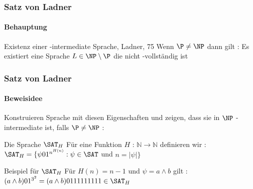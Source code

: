 \begin{frame}
	\frametitle{Satz von Ladner}
	\framesubtitle{Behauptung}
	\begin{KITinfoblock}{Existenz einer \NP -intermediate Sprache, Ladner, 75}
	Wenn $\P \neq \NP$ dann gilt : \newline
	Es existiert eine Sprache $L \in \NP \setminus \P$ die nicht \NP -vollständig ist
	\end{KITinfoblock}
\end{frame}
\begin{frame}
	\frametitle{Satz von Ladner}
	\framesubtitle{Beweisidee}
	Konstruieren Sprache mit diesen Eigenschaften und zeigen, dass sie in $\NP$ -
	intermediate ist, falls $\P \neq \NP$  :
	
	\bigskip
	\pause
	\begin{KITinfoblock}{Die Sprache ${\SAT}_H$}
		Für eine Funktion $H$ : $\mathbb{N} \rightarrow \mathbb{N}$ definieren wir : \newline 	
		${\SAT}_H = \lbrace \psi 01^{n^{H(n)}} : \psi \in \SAT$ und $ n = |\psi| \rbrace$
	\end{KITinfoblock}
	\bigskip
	\pause	
	
	\begin{KITexampleblock}{Beispiel für ${\SAT}_H$}
	F\"ur $H(n) = n - 1$ und $\psi = a \land b$ gilt : \newline
	$(a \land b) 01^{3^2} = (a \land b) 0111111111 \in {\SAT}_H $
	\end{KITexampleblock}
\end{frame}

